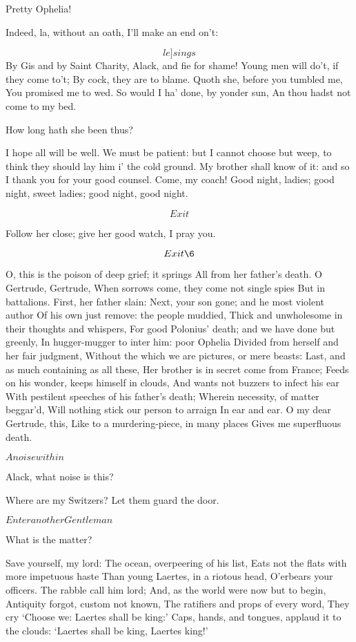 \documentclass[11pt]{book}
\newenvironment {song}[1][0]
 {\Versus 
  \Locus \textus {+7em+#1em} 
  \Forma \strophae {01}
 }
 {\endVersus}
\begin{document}
\2	Pretty Ophelia!

\4	Indeed, la, without an oath, I'll make an end on't:

\begin{song}[-2]
 \[le]sings\] By Gis and by Saint Charity,  
	Alack, and fie for shame! 	
	Young men will do't, if they come to't;
	By cock, they are to blame.
	Quoth she, before you tumbled me,
	You promised me to wed.
	So would I ha' done, by yonder sun,
	An thou hadst not come to my bed.
\end{song}

\2	How long hath she been thus?

\4	I hope all will be well. We must be patient: but I
	cannot choose but weep, to think they should lay him
	i' the cold ground. My brother shall know of it:
	and so I thank you for your good counsel. Come, my
	coach! Good night, ladies; good night, sweet ladies;
	good night, good night.

	\[Exit\]

\endProsa

\2	Follow her close; give her good watch,
	I pray you.

	\[Exit \6\]

	O, this is the poison of deep grief; it springs
	All from her father's death. O Gertrude, Gertrude,
	When sorrows come, they come not single spies
	But in battalions. First, her father slain:
	Next, your son gone; and he most violent author
	Of his own just remove: the people muddied,
	Thick and unwholesome in their thoughts and whispers,
	For good Polonius' death; and we have done but greenly,
	In hugger-mugger to inter him: poor Ophelia
	Divided from herself and her fair judgment,
	Without the which we are pictures, or mere beasts:
	Last, and as much containing as all these,
	Her brother is in secret come from France;
	Feeds on his wonder, keeps himself in clouds,
	And wants not buzzers to infect his ear
	With pestilent speeches of his father's death;
	Wherein necessity, of matter beggar'd,
	Will nothing stick our person to arraign
	In ear and ear. O my dear Gertrude, this,
	Like to a murdering-piece, in many places
	Gives me superfluous death.

	\(A noise within\)

\3	Alack, what noise is this?

\2	Where are my Switzers? Let them guard the door.

	\(Enter another Gentleman\)

	What is the matter?

	Save yourself, my lord:
	The ocean, overpeering of his list,
	Eats not the flats with more impetuous haste
	Than young Laertes, in a riotous head,
	O'erbears your officers. The rabble call him lord;
	And, as the world were now but to begin,
	Antiquity forgot, custom not known,
	The ratifiers and props of every word,
	They cry `Choose we: Laertes shall be king:'
	Caps, hands, and tongues, applaud it to the clouds:
	`Laertes shall be king, Laertes king!'
\end{document}
